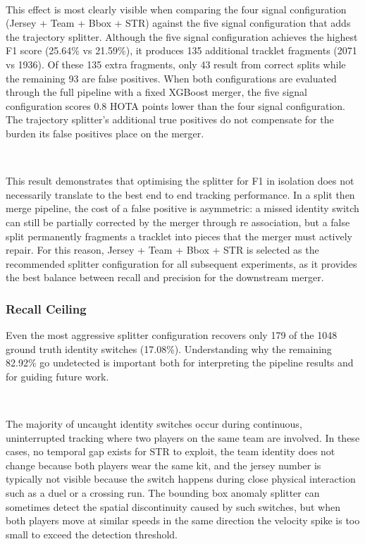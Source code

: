 \

This effect is most clearly visible when comparing the four signal configuration (Jersey + Team + Bbox + STR) against the five signal configuration that adds the trajectory splitter. Although the five signal configuration achieves the highest F1 score (25.64\% vs 21.59\%), it produces 135 additional tracklet fragments (2071 vs 1936). Of these 135 extra fragments, only 43 result from correct splits while the remaining 93 are false positives. When both configurations are evaluated through the full pipeline with a fixed XGBoost merger, the five signal configuration scores 0.8 HOTA points lower than the four signal configuration. The trajectory splitter's additional true positives do not compensate for the burden its false positives place on the merger.

\

This result demonstrates that optimising the splitter for F1 in isolation does not necessarily translate to the best end to end tracking performance. In a split then merge pipeline, the cost of a false positive is asymmetric: a missed identity switch can still be partially corrected by the merger through re association, but a false split permanently fragments a tracklet into pieces that the merger must actively repair. For this reason, Jersey + Team + Bbox + STR is selected as the recommended splitter configuration for all subsequent experiments, as it provides the best balance between recall and precision for the downstream merger.


\subsubsection{Recall Ceiling}\label{sec:recall_ceiling}

Even the most aggressive splitter configuration recovers only 179 of the 1048 ground truth identity switches (17.08\%). Understanding why the remaining 82.92\% go undetected is important both for interpreting the pipeline results and for guiding future work.

\

The majority of uncaught identity switches occur during continuous, uninterrupted tracking where two players on the same team are involved. In these cases, no temporal gap exists for STR to exploit, the team identity does not change because both players wear the same kit, and the jersey number is typically not visible because the switch happens during close physical interaction such as a duel or a crossing run. The bounding box anomaly splitter can sometimes detect the spatial discontinuity caused by such switches, but when both players move at similar speeds in the same direction the velocity spike is too small to exceed the detection threshold.

